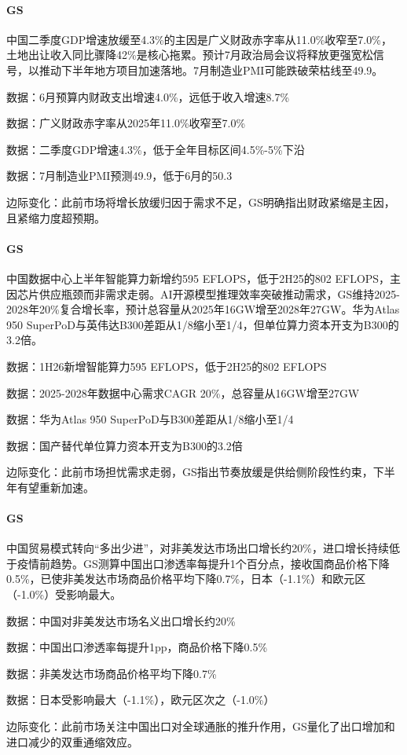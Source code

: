 \documentclass[11pt]{ctexart}
\begin{document}
\paragraph{GS} 中国二季度GDP增速放缓至4.3\%的主因是广义财政赤字率从11.0\%收窄至7.0\%，土地出让收入同比骤降42\%是核心拖累。预计7月政治局会议将释放更强宽松信号，以推动下半年地方项目加速落地。7月制造业PMI可能跌破荣枯线至49.9。
{\small\color{refgray}数据：6月预算内财政支出增速4.0\%，远低于收入增速8.7\%\par}
{\small\color{refgray}数据：广义财政赤字率从2025年11.0\%收窄至7.0\%\par}
{\small\color{refgray}数据：二季度GDP增速4.3\%，低于全年目标区间4.5\%-5\%下沿\par}
{\small\color{refgray}数据：7月制造业PMI预测49.9，低于6月的50.3\par}
{\small\color{refgray}边际变化：此前市场将增长放缓归因于需求不足，GS明确指出财政紧缩是主因，且紧缩力度超预期。\par}
\paragraph{GS} 中国数据中心上半年智能算力新增约595 EFLOPS，低于2H25的802 EFLOPS，主因芯片供应瓶颈而非需求走弱。AI开源模型推理效率突破推动需求，GS维持2025-2028年20\%复合增长率，预计总容量从2025年16GW增至2028年27GW。华为Atlas 950 SuperPoD与英伟达B300差距从1/8缩小至1/4，但单位算力资本开支为B300的3.2倍。
{\small\color{refgray}数据：1H26新增智能算力595 EFLOPS，低于2H25的802 EFLOPS\par}
{\small\color{refgray}数据：2025-2028年数据中心需求CAGR 20\%，总容量从16GW增至27GW\par}
{\small\color{refgray}数据：华为Atlas 950 SuperPoD与B300差距从1/8缩小至1/4\par}
{\small\color{refgray}数据：国产替代单位算力资本开支为B300的3.2倍\par}
{\small\color{refgray}边际变化：此前市场担忧需求走弱，GS指出节奏放缓是供给侧阶段性约束，下半年有望重新加速。\par}
\paragraph{GS} 中国贸易模式转向“多出少进”，对非美发达市场出口增长约20\%，进口增长持续低于疫情前趋势。GS测算中国出口渗透率每提升1个百分点，接收国商品价格下降0.5\%，已使非美发达市场商品价格平均下降0.7\%，日本（-1.1\%）和欧元区（-1.0\%）受影响最大。
{\small\color{refgray}数据：中国对非美发达市场名义出口增长约20\%\par}
{\small\color{refgray}数据：中国出口渗透率每提升1pp，商品价格下降0.5\%\par}
{\small\color{refgray}数据：非美发达市场商品价格平均下降0.7\%\par}
{\small\color{refgray}数据：日本受影响最大（-1.1\%），欧元区次之（-1.0\%）\par}
{\small\color{refgray}边际变化：此前市场关注中国出口对全球通胀的推升作用，GS量化了出口增加和进口减少的双重通缩效应。\par}
\end{document}
